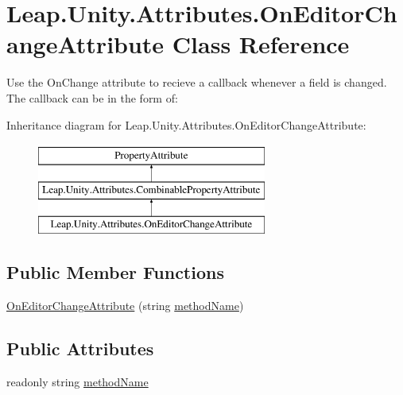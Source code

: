\hypertarget{class_leap_1_1_unity_1_1_attributes_1_1_on_editor_change_attribute}{}\section{Leap.\+Unity.\+Attributes.\+On\+Editor\+Change\+Attribute Class Reference}
\label{class_leap_1_1_unity_1_1_attributes_1_1_on_editor_change_attribute}


Use the On\+Change attribute to recieve a callback whenever a field is changed. The callback can be in the form of\+:  


Inheritance diagram for Leap.\+Unity.\+Attributes.\+On\+Editor\+Change\+Attribute\+:\begin{figure}[H]
\begin{center}
\leavevmode
\includegraphics[height=3.000000cm]{class_leap_1_1_unity_1_1_attributes_1_1_on_editor_change_attribute}
\end{center}
\end{figure}
\subsection*{Public Member Functions}
\begin{DoxyCompactItemize}
\item 
\mbox{\hyperlink{class_leap_1_1_unity_1_1_attributes_1_1_on_editor_change_attribute_aa3132c576e55b39c001c0bd97cf6dd9b}{On\+Editor\+Change\+Attribute}} (string \mbox{\hyperlink{class_leap_1_1_unity_1_1_attributes_1_1_on_editor_change_attribute_ad63cb7d1bcdca28af84e4d1754145686}{method\+Name}})
\end{DoxyCompactItemize}
\subsection*{Public Attributes}
\begin{DoxyCompactItemize}
\item 
readonly string \mbox{\hyperlink{class_leap_1_1_unity_1_1_attributes_1_1_on_editor_change_attribute_ad63cb7d1bcdca28af84e4d1754145686}{method\+Name}}
\end{DoxyCompactItemize}

